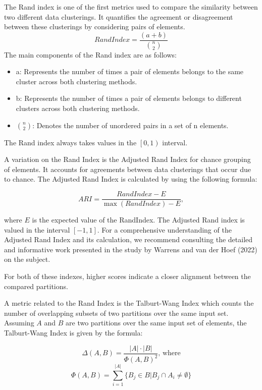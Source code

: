 \documentclass[11pt]{article}
\begin{document}
    The Rand index is one of the first metrics used to compare the similarity
    between two different data clusterings.
    It quantifies the agreement or disagreement between these clusterings by
    considering pairs of elements.
        \[Rand Index = \frac{(a + b)}{{n \choose 2}}\]
    The main components of the Rand index are as follows:
    \begin{itemize}
    \item a: Represents the number of times a pair of elements belongs to the
        same cluster across both clustering methods.
    \item b: Represents the number of times a pair of elements belongs to
        different clusters across both clustering methods.
    \item $n \choose 2$: Denotes the number of unordered pairs in a set of n
        elements.
    \end{itemize}
    
    The Rand index always takes values in the $\left[0, 1\right)$ interval.

    A variation on the Rand Index is the Adjusted Rand Index for chance grouping
    of elements.
    It accounts for agreements between data clusterings that occur due to
    chance\cite{adjrand2001}.
    The Adjusted Rand Index is calculated by using the following formula:
    
    \[ ARI = \frac{RandIndex - E}{\max(RandIndex) - E}, \]

    where $E$ is the expected value of the RandIndex.
    The Adjusted Rand index is valued in the interval $\left[-1, 1\right]$.
    For a comprehensive understanding of the Adjusted Rand Index and its
    calculation, we recommend consulting the detailed and informative work
    presented in the study by Warrens and van der Hoef (2022) on the
    subject\cite{warrens2022understanding}.

    For both of these indexes, higher scores indicate a closer alignment between
    the compared partitions.

    A metric related to the Rand Index is the Talburt-Wang Index which counts
    the number of overlapping subsets of two partitions over the same input set.
    Assuming $A$ and $B$ are two partitions over the same input set of elements,
    the Talburt-Wang Index is given by the formula:

    \[ \varDelta(A, B) = \frac{|A|\cdot|B|}{\varPhi{\left(A, B\right)}^2}\textrm{, where}\]
    \[ \varPhi(A, B) = \sum_{i=1}^{|A|}\{B_j \in B | B_j \cap A_i \neq \emptyset \} \]
\end{document}
